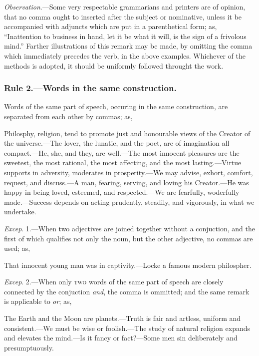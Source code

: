 \emph{Observation}.---Some very respectable grammarians and printers are of
opinion, that no comma ought to inserted after the subject or nominative,
unless it be accompanied with adjuncts which are put in a parenthetical form;
as, ``Inattention to business in hand, let it be what it will, is the sign of a
frivolous mind.'' Farther illustrations of this remark may be made, by omitting
the comma which immediately precedes the verb, in the above examples. Whichever
of the methods is adopted, it should be uniformly followed throught the work.

\subsubsection{Rule 2.---Words in the same construction.}

Words of the same part of speech, occuring in the same construction, are
separated from each other by commas; as,

\begin{example}
    Philosphy, religion, tend to promote just and honourable views of the
    Creator of the universe.---The lover, the lunatic, and the poet, are of
    imagination all compact.---He, she, and they, are well.---The most innocent
    pleasures are the sweetest, the most rational, the most affecting, and the
    most lasting.---Virtue supports in adversity, moderates in
    prosperity.---We may advise, exhort, comfort, request, and discuss.---A
    man, fearing, serving, and loving his Creator.---He was happy in being
    loved, esteemed, and respected.---We are fearfully, woderfully
    made.---Success depends on acting prudently, steadily, and vigorously, in
    what we undertake.
\end{example}

\emph{Excep}. 1.---When two adjectives are joined together without a conjuction,
and the first of which qualifies not only the noun, but the other adjective, no
commas are used; as,

\begin{example}
    That innocent young man was in captivity.---Locke a famous modern
    philospher.
\end{example}

\emph{Excep}. 2.---When only \textsc{two} words of the same part of speech are
closely connected by the conjuction \emph{and}, the comma is ommitted; and the
same remark is applicable to \emph{or}; as,

\begin{example}
    The Earth and the Moon are planets.---Truth is fair and artless, uniform and
    consistent.---We must be wise or foolish.---The study of natural religion
    expands and elevates the mind.---Is it fancy or fact?---Some men sin
    deliberately and presumptuously.
\end{example}

